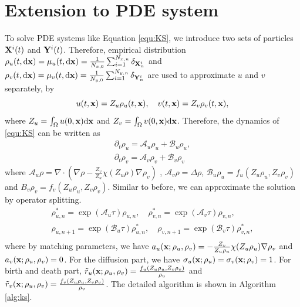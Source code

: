 \documentclass[12pt]{article}
\begin{document}
\section{Extension to PDE system}
\label{sec:extension}
To solve PDE systems like Equation \eqref{equ:KS}, we introduce two sets of particles $\mathbf{X}^i(t)$ and $\mathbf{Y}^i(t)$. Therefore, empirical distribution $\rho_u(t,\mathrm{d} \mathbf{x} ) = \mu_u(t,\mathrm{d} \mathbf{x}) =  \frac{1}{N_{x,0}}\sum_{i=1}^{N_{x,n}}\delta_{\mathbf{X}_n^i} $ and $\rho_v(t,\mathrm{d} \mathbf{x} ) = \mu_v(t,\mathrm{d} \mathbf{x}) =  \frac{1}{N_{y,0}}\sum_{i=1}^{N_{y,n}}\delta_{\mathbf{Y}_n^i}$ are used to approximate $u$ and $v$ separately, by 
\begin{equation}
    u(t,\mathbf{x}) =  Z_u \rho_u(t,\mathbf{x}), \quad v(t,\mathbf{x}) =  Z_v \rho_v(t,\mathbf{x}),
\end{equation}
where $Z_u = \int_\Omega u(0,\mathbf{x}) \mathrm{d} \mathbf{x}$ and $Z_v = \int_\Omega v(0,\mathbf{x}) \mathrm{d} \mathbf{x}$. Therefore, the dynamics of \eqref{equ:KS} can be written as 
\begin{equation}
    \begin{aligned}
        \partial_t \rho_u =  \mathcal A_u \rho_u + \mathcal B_u \rho_u,\\
        \partial_t \rho_v =  \mathcal A_v \rho_v + \mathcal B_v \rho_v
    \end{aligned}
\end{equation}
where $\mathcal A_u \rho = \nabla \cdot ( \nabla \rho - \frac{Z_v}{Z_u} \chi(Z_u\rho) \nabla \rho_v)$ , $\mathcal A_v \rho = \Delta \rho$, $\mathcal B_u \rho_u  = f_u(Z_u\rho_u,Z_v \rho_v)$ and $B_v \rho_v = f_v(Z_u\rho_u,Z_v \rho_v)$. Similar to before, we can approximate the solution by operator splitting. 
\begin{equation}
    \begin{aligned}
        \rho_{u,n}^*  =  \exp(\mathcal A_u\tau) \rho_{u,n}, \quad 
         \rho_{v,n}^*  =  \exp(\mathcal A_v\tau) \rho_{v,n},  \\
         \rho_{u,n+1} =  \exp(\mathcal B_u\tau) \rho_{u,n}^*,  \quad 
         \rho_{v,n+1}  =  \exp(\mathcal B_v\tau) \rho_{v,n}^*,   \\
    \end{aligned}
\end{equation}
where by matching parameters, we have $a_u(\mathbf{x};\rho_u,\rho_v) =  - \frac{Z_v}{Z_u\rho_u} \chi(Z_u\rho_u) \nabla \rho_v $ and $a_v(\mathbf{x};\rho_u,\rho_v)= 0$. For the diffusion part, we have $\sigma_u(\mathbf{x};\rho_u) = \sigma_v(\mathbf{x};\rho_v) = 1$. For birth and death part, $\tilde r_u (\mathbf{x};\rho_u,\rho_v)=  \frac{f_u(Z_u\rho_u,Z_v \rho_v)}{\rho_u}  $ and $\tilde r_v (\mathbf{x};\rho_u,\rho_v )=  \frac{f_v(Z_u\rho_u,Z_v \rho_v)}{\rho_v}  $. The detailed algorithm is shown in  Algorithm \ref{alg:ks}.
\end{document}
